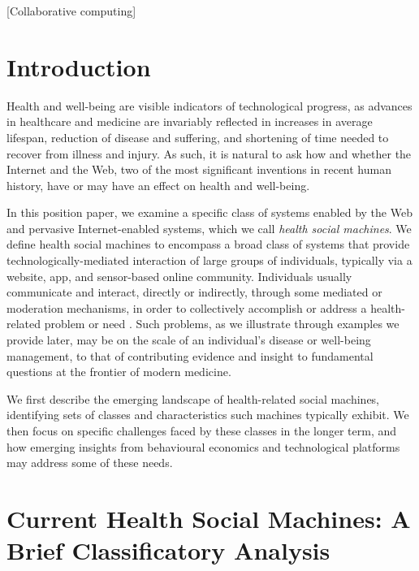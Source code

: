 \documentclass{sig-alternate}
\begin{document}
[Collaborative computing]



\section{Introduction}

Health and well-being are visible indicators of technological
progress, as advances in healthcare and medicine are invariably
reflected in increases in average lifespan, reduction of disease and
suffering, and shortening of time needed to recover from illness and
injury.  As such, it is natural to ask how and whether the Internet
and the Web, two of the most significant inventions in recent human
history, have or may have an effect on health and well-being.

In this position paper, we examine a specific class of systems enabled
by the Web and pervasive Internet-enabled systems, which we call
\emph{health social machines}.  We define health social machines to
encompass a broad class of systems that provide
technologically-mediated interaction of large groups of individuals,
typically via a website, app, and sensor-based online community.
Individuals usually communicate and interact, directly or indirectly,
through some mediated or moderation mechanisms, in order to
collectively accomplish or address a health-related problem or need
\cite{hendler2010semantic}.  Such problems, as we illustrate through
examples we provide later, may be on the scale of an individual's
disease or well-being management, to that of contributing evidence and
insight to fundamental questions at the frontier of modern medicine.

We first describe the emerging landscape of health-related social
machines, identifying sets of classes and characteristics such
machines typically exhibit.  We then focus on specific challenges
faced by these classes in the longer term, and how emerging insights
from behavioural economics and technological platforms may address
some of these needs.

\section{Current Health Social Machines: A Brief Classificatory Analysis}
\end{document}
